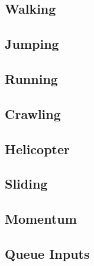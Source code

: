 \subsection{Walking}
\label{subsec:walking}


\subsection{Jumping}
\label{subsec:jumping}


\subsection{Running}
\label{subsec:running}


\subsection{Crawling}
\label{subsec:crawling}


\subsection{Helicopter}
\label{subsec:helicopter-mov}


\subsection{Sliding}
\label{subsec:sliding}


\subsection{Momentum}
\label{subsec:momentum}


\subsection{Queue Inputs}
\label{subsec:queue}

